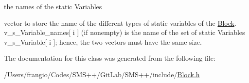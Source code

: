 the names of the static Variables 

vector to store the name of the different types of static variables of the \mbox{\hyperlink{class_s_m_spp__di__unipi__it_1_1_block}{Block}}. v\+\_\+s\+\_\+\+Variable\+\_\+names\mbox{[} i \mbox{]} (if nonempty) is the name of the set of static Variables v\+\_\+s\+\_\+\+Variable\mbox{[} i \mbox{]}; hence, the two vectors must have the same size. 

The documentation for this class was generated from the following file\+:\begin{DoxyCompactItemize}
\item 
/\+Users/frangio/\+Codes/\+S\+M\+S++/\+Git\+Lab/\+S\+M\+S++/include/\mbox{\hyperlink{_block_8h}{Block.\+h}}\end{DoxyCompactItemize}
